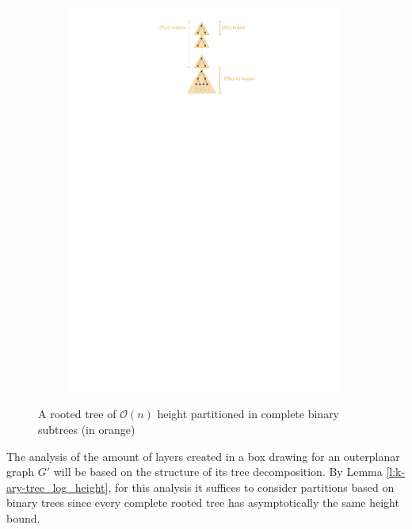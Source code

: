 	\begin{figure}[H]
	\centering
	\begin{subfigure}{\textwidth}
		\centering
		\includegraphics[page=1,width=0.7\linewidth]{graphics/k-ary_tree_partitioning_example.pdf}
	\end{subfigure}
	\caption{A rooted tree of $\mathcal{O}(n)$ height partitioned in complete binary subtrees (in orange)}\label{im:partitioning_example}
\end{figure}

The analysis of the amount of layers created in a box drawing for an outerplanar graph $G'$ will be based on the structure of its tree decomposition. By Lemma \ref{l:k-ary-tree_log_height}, for this analysis it suffices to consider partitions based on binary trees since every complete rooted tree has asymptotically the same height bound.

